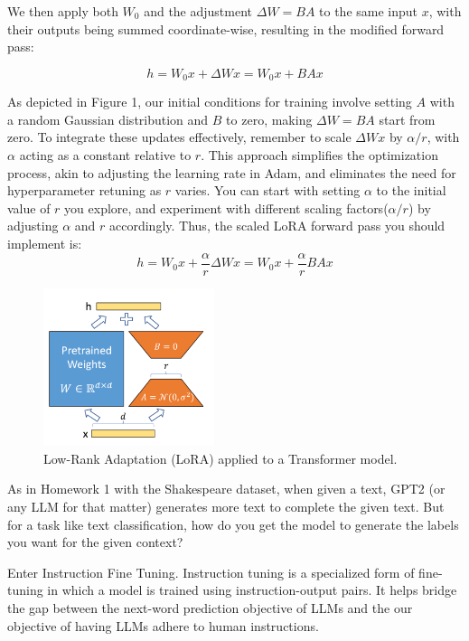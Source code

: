 \documentclass[11pt,addpoints,answers]{exam}
\begin{document}
\begin{questions}
We then apply both \(W_0\) and the adjustment \(\Delta W = BA\) to the same input \(x\), with their outputs being summed coordinate-wise, resulting in the modified forward pass:

\[
h = W_0x + \Delta Wx = W_0x + BAx
\]

As depicted in Figure 1, our initial conditions for training involve setting \(A\) with a random Gaussian distribution and \(B\) to zero, making \(\Delta W = BA\) start from zero. To integrate these updates effectively, remember to scale \(\Delta W x\) by \(\alpha/ r\), with \(\alpha\) acting as a constant relative to \(r\). This approach simplifies the optimization process, akin to adjusting the learning rate in Adam, and eliminates the need for hyperparameter retuning as \(r\) varies. You can start with setting \(\alpha\) to the initial value of \(r\) you explore, and experiment with different scaling factors(\(\alpha/ r\)) by adjusting  \(\alpha\) and \(r\) accordingly. Thus, the scaled LoRA forward pass you should implement is:
\[
h = W_0x + \frac{\alpha}{r} \Delta Wx  = W_0x + \frac{\alpha}{r} BAx 
\]


\begin{figure}[h]
\centering
\includegraphics[width=5cm]{fig/lora.png}
\caption{Low-Rank Adaptation (LoRA) applied to a Transformer model.}
\label{fig:lora}
\end{figure}


As in Homework 1 with the Shakespeare dataset, when given a text, GPT2 (or any LLM for that matter) generates more text to complete the given text. But for a task like text classification, how do you get the model to generate the labels you want for the given context? 

Enter Instruction Fine Tuning. Instruction tuning is a specialized form of fine-tuning in which a model is trained using instruction-output pairs. It helps bridge the gap between the next-word prediction objective of LLMs and the our objective of having LLMs adhere to human instructions.


\end{questions}
\end{document}

